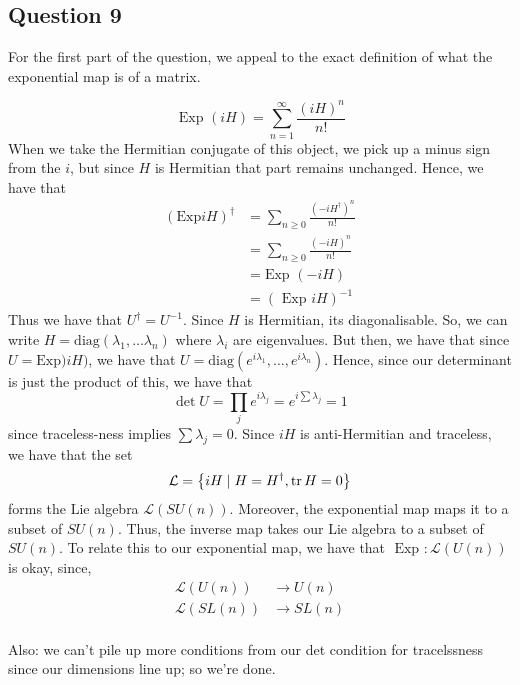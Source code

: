 \subsection{Question 9} 
For the first part of the question, we appeal to 
the exact definition of what the exponential map is of a matrix. 

\[
	\text{ Exp } ( i H ) = \sum_{n=1}^{\infty} \frac{( i H ) ^ n }{ n ! }
\] When we take the Hermitian conjugate of this object, 
we pick up a minus sign from the $ i $, but since $ H $ is Hermitian that part 
remains unchanged. 
Hence, we have that 
\begin{align*}
	( \text{Exp} i H ) ^ \dagger &=  \sum_{ n \geq 0 } \frac{ ( - i H^\dagger ) ^ n }{ n ! } \\
				     &=  \sum_{ n \geq 0 } \frac{  ( - i H ) ^ n }{ n ! } \\
				     &=  \text{Exp } ( - i H )  \\
				     &=  ( \text{ Exp } i H )^{ - 1 }
\end{align*}
Thus we have that $ U^ \dagger = U ^{ - 1}$. 
Since $ H $ is Hermitian, its diagonalisable. 
So, we can write $ H = \text{diag} ( \lambda_1 , \dots \lambda_ n ) $ 
where $ \lambda_ i $ are eigenvalues. 
But then, we have that since $ U = \text{Exp} ) i H ) $, 
we have that $ U = \text{diag} ( e^{ i \lambda_1  } , \dots , e^{ i \lambda_n } ) $. 
Hence, since our determinant is just the product of this, we
have that 
\[
 \det U = \prod_{ j } e^{  i \lambda_j  } = e^{ i \sum \lambda_ j } = 1 
\] since traceless-ness implies $ \sum \lambda_ j = 0 $. 
Since  $ i H $ is anti-Hermitian and traceless, we have that the set 
\[
 \mathcal{ L } = \left\{  i H \mid H  = H^\dagger, \tr H = 0 \right\} 
\] forms the Lie algebra $ \mathcal{ L } ( S U ( n ) ) $. 
Moreover, the exponential map maps it to a subset of $ SU ( n ) $. 
Thus, the inverse map takes our Lie algebra to a subset of  $ SU ( n ) $. 
To relate this to our exponential map, 
we have that $ \text{ Exp } : \mathcal{ L } ( U ( n ) )  $ is okay, since, 
\begin{align*}
	\mathcal{ L } ( U ( n ) )  & \to U ( n ) \\
	\mathcal{ L } ( SL ( n ) ) & \to SL ( n ) \\
\end{align*}

Also: we can't pile up more
conditions from our det condition for tracelssness since 
our dimensions line up; so we're done. 
\pagebreak 
